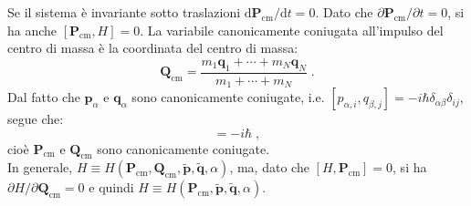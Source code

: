 \documentclass[12pt,a4paper]{report}
\theoremstyle{definition}
\numberwithin{equation}{section}
\newcommand{\diff}[1][]{\mathrm{d}#1}
\begin{document}
Se il sistema è invariante sotto traslazioni $\diff{\mathbf{P}_{\mathrm{cm}}}/\diff{t}=0$. Dato che $\partial\mathbf{P}_{\mathrm{cm}}/\partial t=0$, si ha anche $[\mathbf{P}_{\mathrm{cm}},H]=0$. La variabile canonicamente coniugata all'impulso del centro di massa è la coordinata del centro di massa:
\begin{equation}
\mathbf{Q}_{\mathrm{cm}}=\frac{m_1\mathbf{q}_1+\cdots+m_N\mathbf{q}_N}{m_1+\cdots+m_N}\;.
\end{equation}
Dal fatto che $\mathbf{p}_{\alpha}$ e $\mathbf{q}_{\alpha}$ sono canonicamente coniugate, i.e. $[p_{\alpha,i},q_{\beta,j}]=-i\hbar\delta_{\alpha\beta}\delta_{ij}$, segue che:
\begin{equation}
[\mathbf{P}_{\mathrm{cm}},\mathbf{Q}_{\mathrm{cm}}]=-i\hbar\;,
\end{equation}
cioè $\mathbf{P}_{\mathrm{cm}}$ e $\mathbf{Q}_{\mathrm{cm}}$ sono canonicamente coniugate. \\
In generale, $H\equiv H(\mathbf{P}_{\mathrm{cm}},\mathbf{Q}_{\mathrm{cm}},\tilde{\mathbf{p}},\tilde{\mathbf{q}},\alpha)$, ma, dato che $[H,\mathbf{P}_{\mathrm{cm}}]=0$, si ha $\partial H/\partial \mathbf{Q}_{\mathrm{cm}}=0$ e quindi $H\equiv H(\mathbf{P}_{\mathrm{cm}},\tilde{\mathbf{p}},\tilde{\mathbf{q}},\alpha)$.
\end{document}
